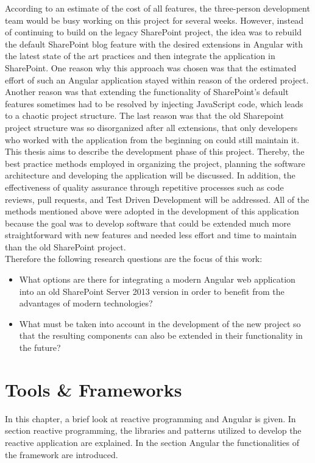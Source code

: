 \documentclass[Bachelor,BIF,english]{twbook}
\begin{document}
According to an estimate of the cost of all features, the three-person development team would be busy working on this project for several weeks. However, instead of continuing to build on the legacy SharePoint project, the idea was to rebuild the default SharePoint blog feature with the desired extensions in Angular with the latest state of the art practices and then integrate the application in SharePoint. One reason why this approach was chosen was that the estimated effort of such an Angular application stayed within reason of the ordered project. Another reason was that extending the functionality of SharePoint's default features sometimes had to be resolved by injecting JavaScript code, which leads to a chaotic project structure. The last reason was that the old Sharepoint project structure was so disorganized after all extensions, that only developers who worked with the application from the beginning on could still maintain it.
\\[\baselineskip]
This thesis aims to describe the development phase of this project. Thereby, the best practice methods employed in organizing the project, planning the software architecture and developing the application will be discussed. In addition, the effectiveness of quality assurance through repetitive processes such as code reviews, pull requests, and Test Driven Development will be addressed. All of the methods mentioned above were adopted in the development of this application because the goal was to develop software that could be extended much more straightforward with new features and needed less effort and time to maintain than the old SharePoint project.
\\[\baselineskip]
Therefore the following research questions are the focus of this work:
\begin{itemize}
\item What options are there for integrating a modern Angular web application into an old SharePoint Server 2013 version in order to benefit from the advantages of modern technologies?
\item What must be taken into account in the development of the new project so that the resulting components can also be extended in their functionality in the future?
\end{itemize}

\clearpage


\chapter{Tools \& Frameworks} 
In this chapter, a brief look at reactive programming and Angular is given. In section reactive programming, the libraries and patterns utilized to develop the reactive application are explained. In the section Angular the functionalities of the framework are introduced.
\end{document}
